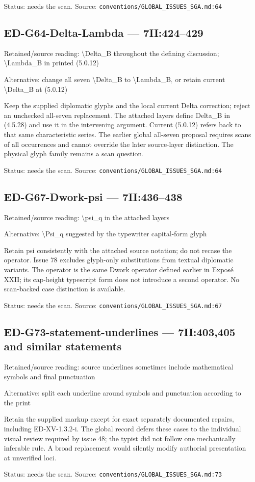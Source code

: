 Status: needs the scan. Source: \nolinkurl{conventions/GLOBAL_ISSUES_SGA.md:64}

\subsection*{ED-G64-Delta-Lambda — 7II:424–429}

Retained/source reading: \textbackslash{}Delta\_B throughout the defining discussion; \textbackslash{}Lambda\_B in printed (5.0.12)

Alternative: change all seven \textbackslash{}Delta\_B to \textbackslash{}Lambda\_B, or retain current \textbackslash{}Delta\_B at (5.0.12)

Keep the supplied diplomatic glyphs and the local current Delta correction; reject an unchecked all-seven replacement. The attached layers define Delta\_B in (4.5.28) and use it in the intervening argument. Current (5.0.12) refers back to that same characteristic series. The earlier global all-seven proposal requires scans of all occurrences and cannot override the later source-layer distinction. The physical glyph family remains a scan question.

Status: needs the scan. Source: \nolinkurl{conventions/GLOBAL_ISSUES_SGA.md:64}

\subsection*{ED-G67-Dwork-psi — 7II:436–438}

Retained/source reading: \textbackslash{}psi\_q in the attached layers

Alternative: \textbackslash{}Psi\_q suggested by the typewriter capital-form glyph

Retain psi consistently with the attached source notation; do not recase the operator. Issue 78 excludes glyph-only substitutions from textual diplomatic variants. The operator is the same Dwork operator defined earlier in Exposé XXII; its cap-height typescript form does not introduce a second operator. No scan-backed case distinction is available.

Status: needs the scan. Source: \nolinkurl{conventions/GLOBAL_ISSUES_SGA.md:67}

\subsection*{ED-G73-statement-underlines — 7II:403,405 and similar statements}

Retained/source reading: source underlines sometimes include mathematical symbols and final punctuation

Alternative: split each underline around symbols and punctuation according to the print

Retain the supplied markup except for exact separately documented repairs, including ED-XV-1.3.2-i. The global record defers these cases to the individual visual review required by issue 48; the typist did not follow one mechanically inferable rule. A broad replacement would silently modify authorial presentation at unverified loci.

Status: needs the scan. Source: \nolinkurl{conventions/GLOBAL_ISSUES_SGA.md:73}
